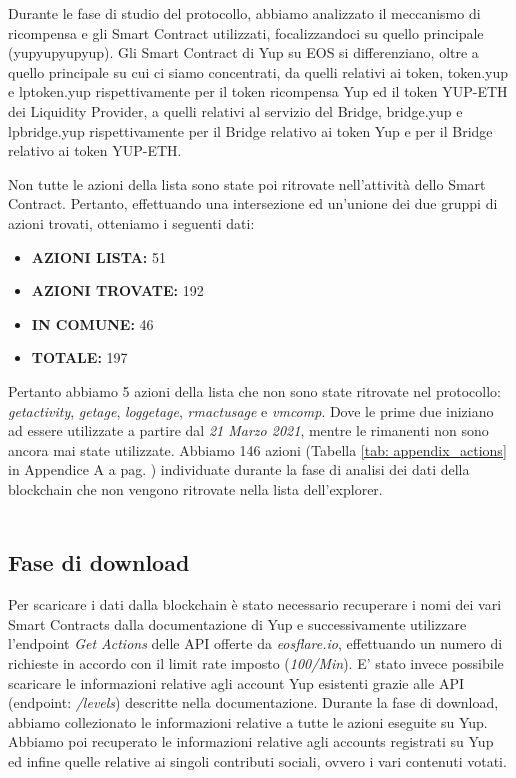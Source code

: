Durante le fase di studio del protocollo, abbiamo analizzato il meccanismo di ricompensa e gli Smart Contract utilizzati, focalizzandoci su quello principale (yupyupyupyup). 
Gli Smart Contract di Yup su EOS si differenziano, oltre a quello principale su cui ci siamo concentrati, da quelli relativi ai token, token.yup e lptoken.yup rispettivamente per il token ricompensa Yup ed il token YUP-ETH dei Liquidity Provider, a quelli relativi al servizio del Bridge, bridge.yup e lpbridge.yup rispettivamente per il Bridge relativo ai token Yup e per il Bridge relativo ai token YUP-ETH.

Non tutte le azioni della lista sono state poi ritrovate nell'attività dello Smart Contract.
Pertanto, effettuando una intersezione ed un'unione dei due gruppi di azioni trovati, otteniamo i seguenti dati:

\begin{itemize}
    \item \textbf{AZIONI LISTA:} 51
    \item \textbf{AZIONI TROVATE:} 192
    \item \textbf{IN COMUNE:} 46
    \item \textbf{TOTALE:} 197
\end{itemize}

Pertanto abbiamo 5 azioni della lista che non sono state ritrovate nel protocollo: \textit{getactivity}, \textit{getage}, \textit{loggetage}, \textit{rmactusage} e \textit{vmcomp}. Dove le prime due iniziano ad essere utilizzate a partire dal \textit{21 Marzo 2021}, mentre le rimanenti non sono ancora mai state utilizzate. Abbiamo 146 azioni (Tabella \ref{tab: appendix_actions} in Appendice A a pag. \pageref{appendix_marker}) individuate durante la fase di analisi dei dati della blockchain che non vengono ritrovate nella lista dell'explorer.
\\
\\

\subsection{Fase di download}
Per scaricare i dati dalla blockchain è stato necessario recuperare i nomi dei vari Smart Contracts dalla documentazione di Yup e successivamente utilizzare l'endpoint \textit{Get Actions} delle API offerte da \textit{eosflare.io}, effettuando un numero di richieste in accordo con il limit rate imposto (\textit{100/Min}). E' stato invece possibile scaricare le informazioni relative agli account Yup esistenti grazie alle API (endpoint: \textit{/levels}) descritte nella documentazione.
Durante la fase di download, abbiamo collezionato le informazioni relative a tutte le azioni eseguite su Yup. Abbiamo poi recuperato le informazioni relative agli accounts registrati su Yup ed infine quelle relative ai singoli contributi sociali, ovvero i vari contenuti votati.

